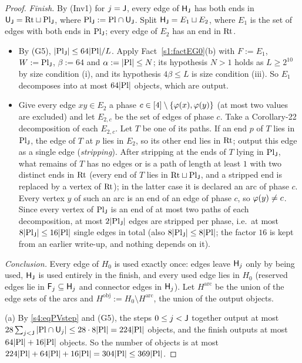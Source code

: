 \begin{proof}
\emph{Finish.} By (Inv1) for $j=\mathsf{J}$, every edge of $\mathsf{H}_{\mathsf{J}}$ has both ends in $\mathsf{U}_{\mathsf{J}}=\mathrm{Rt}\sqcup \mathrm{Pl}_{\mathsf{J}}$, where
$\mathrm{Pl}_{\mathsf{J}}:=\mathrm{Pl}\cap\mathsf{U}_{\mathsf{J}}$. Split $\mathsf{H}_{\mathsf{J}}=E_1\sqcup E_2$, where $E_1$ is the set of edges with both ends in
$\mathrm{Pl}_{\mathsf{J}}$; every edge of $E_2$ has an end in $\mathrm{Rt}$.
\begin{itemize}
\item By (G5), $|\mathrm{Pl}_{\mathsf{J}}|\le64|\mathrm{Pl}|/L$. Apply Fact~\ref{s1:factEG0}(b) with $F:=E_1$, $W:=\mathrm{Pl}_{\mathsf{J}}$, $\beta:=64$ and
  $\alpha:=|\mathrm{Pl}|\le N$; its hypothesis $N>1$ holds as $L\ge2^{10}$ by size condition (i), and its hypothesis $4\beta\le L$
  is size condition (iii). So $E_1$ decomposes into at most $64|\mathrm{Pl}|$
  objects, which are output.
\item Give every edge $xy\in E_2$ a phase $c\in[4]\setminus\{\varphi(x),\varphi(y)\}$ (at most two values are excluded)
  and let $E_{2,c}$ be the set of edges of phase $c$. Take a Corollary-22 decomposition of each $E_{2,c}$. Let $T$ be
  one of its paths. If an end $p$ of $T$ lies in $\mathrm{Pl}_{\mathsf{J}}$, the edge of $T$ at $p$ lies in $E_2$, so its other end
  lies in $\mathrm{Rt}$; output this edge as a single edge (\emph{stripping}). After stripping at the ends of $T$ lying in
  $\mathrm{Pl}_{\mathsf{J}}$, what remains of $T$ has no edges or is a path of length at least $1$ with two distinct ends in $\mathrm{Rt}$ (every end
  of $T$ lies in $\mathrm{Rt}\sqcup \mathrm{Pl}_{\mathsf{J}}$, and a stripped end is replaced by a vertex of $\mathrm{Rt}$); in the latter case it is
  declared an arc of phase $c$. Every vertex $y$ of such an arc is an end of an edge of phase $c$, so
  $\varphi(y)\ne c$. Since every vertex of $\mathrm{Pl}_{\mathsf{J}}$ is an end of at most two paths of each decomposition, at most
  $2|\mathrm{Pl}_{\mathsf{J}}|$ edges are stripped per phase, i.e.\ at most $8|\mathrm{Pl}_{\mathsf{J}}|\le16|\mathrm{Pl}|$ single
  edges in total (also $8|\mathrm{Pl}_{\mathsf{J}}|\le8|\mathrm{Pl}|$; the factor $16$ is kept from an earlier write-up, and nothing
  depends on it).
\end{itemize}

\emph{Conclusion.} Every edge of $H_0$ is used exactly once: edges leave $\mathsf{H}_j$ only by being used, $\mathsf{H}_{\mathsf{J}}$ is
used entirely in the finish, and every used edge lies in $H_0$ (reserved edges lie in $\mathsf{F}_j\subseteq\mathsf{H}_j$ and
connector edges in $\mathsf{H}_j$). Let $H^{\mathrm{arc}}$ be the union of the edge sets of the arcs and
$H^{\mathrm{obj}}:=H_0\setminus H^{\mathrm{arc}}$, the union of the output objects.

(a) By \eqref{s4:eqPVstep} and (G5), the steps $0\le j<\mathsf{J}$ together output at most
$28\sum_{j<\mathsf{J}}|\mathrm{Pl}\cap\mathsf{U}_j|\le28\cdot8|\mathrm{Pl}|=224|\mathrm{Pl}|$ objects, and the finish outputs at most $64|\mathrm{Pl}|+16|\mathrm{Pl}|$
objects. So the number of objects is at most $224|\mathrm{Pl}|+64|\mathrm{Pl}|+16|\mathrm{Pl}|=304|\mathrm{Pl}|\le369|\mathrm{Pl}|$.


\end{proof}

